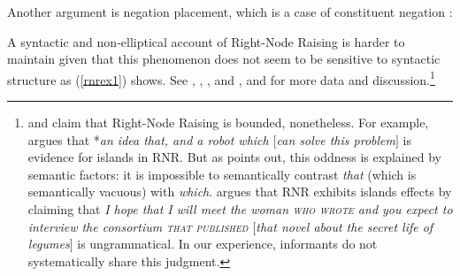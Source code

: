\documentclass[output=paper]{langsci/langscibook}
\begin{document}
\begin{exe}
\ex 
\begin{xlista}


\end{xlista}
\end{exe}

\noindent
Another argument is negation placement, which is a case of constituent negation
\citep[253]{Mouret:06}: 

\begin{exe}
 \ex 
 \begin{xlista}
\end{xlista}
\end{exe}


A syntactic and non-elliptical account of Right-Node Raising is harder to maintain given that this phenomenon does not seem to be sensitive to  syntactic structure as (\ref{rnrex1}) shows. See 
\citet{bresnan74},
 \citet[299]{wexlercull},  \citet[45]{grosu81},
 and \citet{
mccawley},  and \citet[382,ft.30]{sab}
for more data and discussion.\footnote{\citet{
steedman85,gapsteed,steedmanbook}
and \citet[183]{dowty88} claim that
Right-Node Raising is bounded, nonetheless.
For example, \citet{
dowty88} argues that  *\emph{an idea that, and a robot which $[$can solve this problem$]$} is  evidence for islands in RNR. But as \citet[95]{phil}
 points out, this oddness is explained by semantic factors: it is impossible to   semantically contrast \emph{that} (which is semantically vacuous) with \emph{which}.
 \citet[17]{steedmanbook}   argues that RNR
exhibits islands effects by claiming that \emph{I hope that I will meet the woman
\textsc{who wrote} and you expect to interview the
consortium \textsc{that published} $[$that
novel about the secret life of legumes$]$} is ungrammatical.
In our experience, informants do not systematically share this judgment.}
\end{document}
